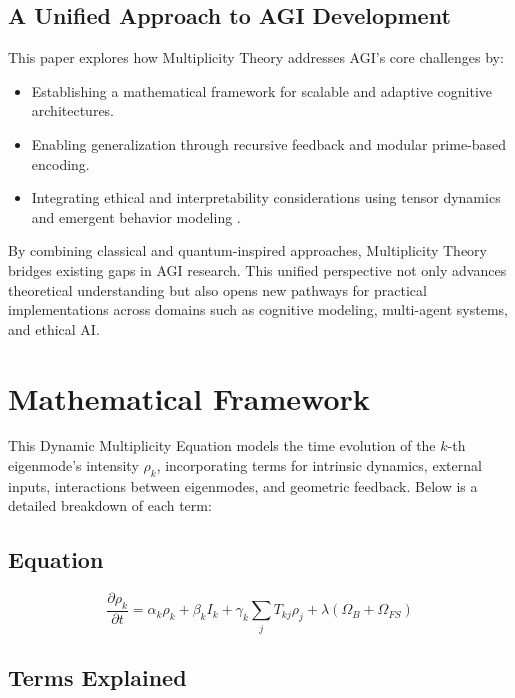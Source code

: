 \documentclass{article}
\theoremstyle{plain}
\begin{document}
\subsection{A Unified Approach to AGI Development}
This paper explores how Multiplicity Theory addresses AGI’s core challenges by:
\begin{itemize}
    \item Establishing a mathematical framework for scalable and adaptive cognitive architectures.
    \item Enabling generalization through recursive feedback and modular prime-based encoding.
    \item Integrating ethical and interpretability considerations using tensor dynamics and emergent behavior modeling \cite{wolfram2020hypergraph}.
\end{itemize}

By combining classical and quantum-inspired approaches, Multiplicity Theory bridges existing gaps in AGI research. This unified perspective not only advances theoretical understanding but also opens new pathways for practical implementations across domains such as cognitive modeling, multi-agent systems, and ethical AI.

\section{Mathematical Framework}

This Dynamic Multiplicity Equation models the time evolution of the \(k\)-th eigenmode’s intensity \(\rho_k\), incorporating terms for intrinsic dynamics, external inputs, interactions between eigenmodes, and geometric feedback. Below is a detailed breakdown of each term:

\subsection*{Equation}
\begin{equation}
\frac{\partial \rho_k}{\partial t} = \alpha_k \rho_k + \beta_k I_k + \gamma_k \sum_j T_{kj} \rho_j + \lambda (\Omega_B + \Omega_{FS})
\end{equation}

\subsection{Terms Explained}
\end{document}

